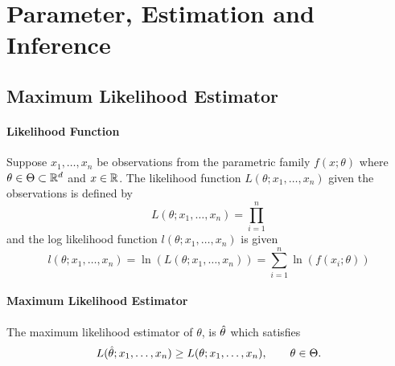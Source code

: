 \section{Parameter, Estimation and Inference}

\subsection{Maximum Likelihood Estimator}
\paragraph{Likelihood Function}
Suppose \(x_1, \dots, x_n\) be observations from the parametric family \(f(x; \theta)\) where \(\theta \in \Theta \subset \mathbb{R}^d\) and \(x \in \mathbb{R}\). The likelihood function \(L(\theta; x_1, \dots, x_n)\) given the observations is defined by
\[L(\theta; x_1, \dots, x_n) = \prod_{i=1}^n \]
and the log likelihood function \(l(\theta; x_1, \dots, x_n)\) is given
\[l(\theta; x_1, \dots, x_n) = \ln(L(\theta; x_1, \dots, x_n)) = \sum_{i=1}^n \ln(f(x_i; \theta))\]

\paragraph{Maximum Likelihood Estimator}
The maximum likelihood estimator of \(\theta\), is \(\hat{\theta}\) which satisfies
\[L(\hat{\theta}; x_1, \dots, x_n) \geq L(\theta; x_1, \dots, x_n), \qquad \theta \in \Theta.\]